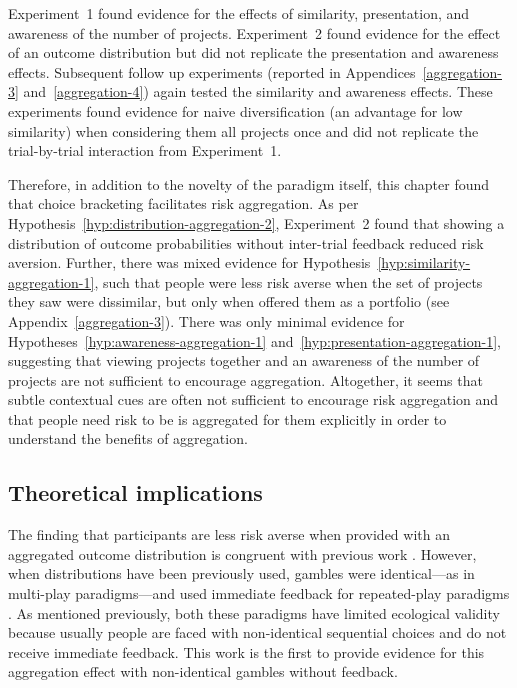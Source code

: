 \documentclass[a4paper, nobind, dvipsnames]{templates/ociamthesis}
\theoremstyle{definition}
\theoremstyle{definition}
\theoremstyle{definition}
\theoremstyle{definition}
\theoremstyle{remark}
\begin{document}
Experiment~1 found evidence for the effects of similarity, presentation, and
awareness of the number of projects. Experiment~2 found evidence for the effect
of an outcome distribution but did not replicate the presentation and awareness
effects. Subsequent follow up experiments (reported in
Appendices~\ref{aggregation-3} and~\ref{aggregation-4}) again tested the
similarity and awareness effects. These experiments found evidence for naive
diversification (an advantage for low similarity) when considering them all
projects once and did not replicate the trial-by-trial interaction from
Experiment~1.

Therefore, in addition to the novelty of the paradigm itself, this chapter found
that choice bracketing facilitates risk aggregation. As per
Hypothesis~\ref{hyp:distribution-aggregation-2}, Experiment~2 found that
showing a distribution of outcome probabilities without inter-trial feedback
reduced risk aversion. Further, there was mixed evidence for
Hypothesis~\ref{hyp:similarity-aggregation-1}, such that people were less risk
averse when the set of projects they saw were dissimilar, but only when offered
them as a portfolio (see Appendix~\ref{aggregation-3}). There was only minimal
evidence for Hypotheses~\ref{hyp:awareness-aggregation-1}
and~\ref{hyp:presentation-aggregation-1}, suggesting that viewing projects
together and an awareness of the number of projects are not sufficient to
encourage aggregation. Altogether, it seems that subtle contextual cues are
often not sufficient to encourage risk aggregation and that people need risk to
be is aggregated for them explicitly in order to understand the benefits of
aggregation.

\subsection{Theoretical implications}

The finding that participants are less risk averse when provided with an
aggregated outcome distribution is congruent with previous work \autocite[e.g.,][]{redelmeier1992}. However, when distributions have been previously used, gambles
were identical---as in multi-play paradigms---and used immediate feedback for
repeated-play paradigms \autocite[e.g.,][]{benartzi1999}. As mentioned previously, both
these paradigms have limited ecological validity because usually people are
faced with non-identical sequential choices and do not receive immediate
feedback. This work is the first to provide evidence for this aggregation effect
with non-identical gambles without feedback.
\end{document}
